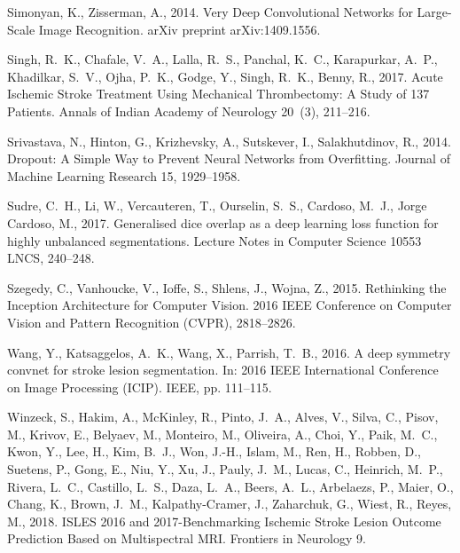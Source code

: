 \documentclass[letterpaper,final,authoryear,3p,times,twocolumn]{elsarticle}
\begin{document}
\begin{thebibliography}{36}
Simonyan, K., Zisserman, A., 2014. {Very Deep Convolutional Networks for
  Large-Scale Image Recognition}. arXiv preprint arXiv:1409.1556.

Singh, R.~K., Chafale, V.~A., Lalla, R.~S., Panchal, K.~C., Karapurkar, A.~P.,
  Khadilkar, S.~V., Ojha, P.~K., Godge, Y., Singh, R.~K., Benny, R., 2017.
  {Acute Ischemic Stroke Treatment Using Mechanical Thrombectomy: A Study of
  137 Patients.} Annals of Indian Academy of Neurology 20~(3), 211--216.

Srivastava, N., Hinton, G., Krizhevsky, A., Sutskever, I., Salakhutdinov, R.,
  2014. {Dropout: A Simple Way to Prevent Neural Networks from Overfitting}.
  Journal of Machine Learning Research 15, 1929--1958.

Sudre, C.~H., Li, W., Vercauteren, T., Ourselin, S.~S., Cardoso, M.~J., {Jorge
  Cardoso}, M., 2017. {Generalised dice overlap as a deep learning loss
  function for highly unbalanced segmentations}. Lecture Notes in Computer
  Science 10553 LNCS, 240--248.

Szegedy, C., Vanhoucke, V., Ioffe, S., Shlens, J., Wojna, Z., 2015. {Rethinking
  the Inception Architecture for Computer Vision}. 2016 IEEE Conference on
  Computer Vision and Pattern Recognition (CVPR), 2818--2826.

Wang, Y., Katsaggelos, A.~K., Wang, X., Parrish, T.~B., 2016. {A deep symmetry
  convnet for stroke lesion segmentation}. In: 2016 IEEE International
  Conference on Image Processing (ICIP). IEEE, pp. 111--115.

Winzeck, S., Hakim, A., McKinley, R., Pinto, J.~A., Alves, V., Silva, C.,
  Pisov, M., Krivov, E., Belyaev, M., Monteiro, M., Oliveira, A., Choi, Y.,
  Paik, M.~C., Kwon, Y., Lee, H., Kim, B.~J., Won, J.-H., Islam, M., Ren, H.,
  Robben, D., Suetens, P., Gong, E., Niu, Y., Xu, J., Pauly, J.~M., Lucas, C.,
  Heinrich, M.~P., Rivera, L.~C., Castillo, L.~S., Daza, L.~A., Beers, A.~L.,
  Arbelaezs, P., Maier, O., Chang, K., Brown, J.~M., Kalpathy-Cramer, J.,
  Zaharchuk, G., Wiest, R., Reyes, M., 2018. {ISLES 2016 and 2017-Benchmarking
  Ischemic Stroke Lesion Outcome Prediction Based on Multispectral MRI}.
  Frontiers in Neurology 9.


\end{thebibliography}
\end{document}
